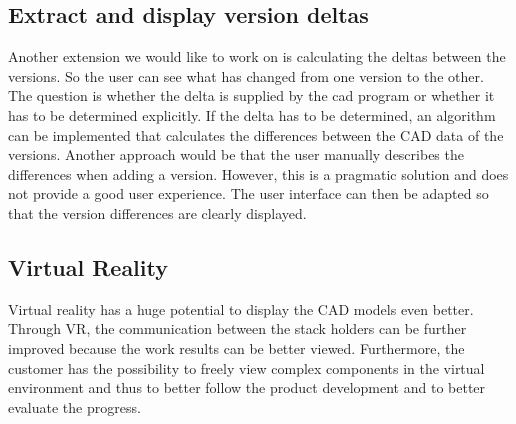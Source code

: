 \subsection*{Extract and display version deltas}
Another extension we would like to work on is calculating the deltas between the versions. So the user can see what has changed from one version to the other. The question is whether the delta is supplied by the cad program or whether it has to be determined explicitly. If the delta has to be determined, an algorithm can be implemented that calculates the differences between the CAD data of the versions. Another approach would be that the user manually describes the differences when adding a version. However, this is a pragmatic solution and does not provide a good user experience. The user interface can then be adapted so that the version differences are clearly displayed.

\subsection*{Virtual Reality}
Virtual reality has a huge potential to display the CAD models even better. Through VR, the communication between the stack holders can be further improved because the work results can be better viewed. Furthermore, the customer has the possibility to freely view complex components in the virtual environment and thus to better follow the product development and to better evaluate the progress.

